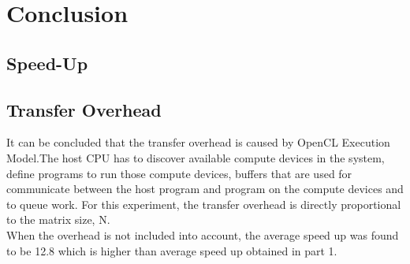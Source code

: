 \section{Conclusion}

\subsection{Speed-Up}

\subsection{Transfer Overhead}

It can be concluded that the transfer overhead is caused by OpenCL Execution Model.The host CPU has to discover available compute devices in the system, define programs to run those compute devices, buffers that are used for communicate between the host program and program on the compute devices and to queue work. For this experiment, the transfer overhead is directly proportional to the matrix size, N.
\\
When the overhead is not included into account, the average speed up was found to be 12.8 which is higher than average speed up obtained in part 1.

